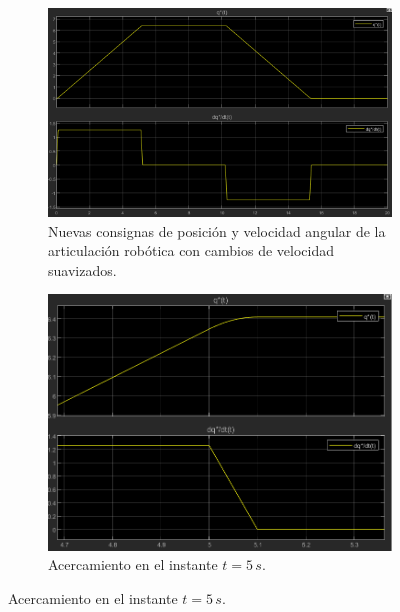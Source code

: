 \documentclass{article}
\begin{document}
\begin{figure}[H]
    \centering
    \begin{subfigure}[t]{0.55\textwidth}
        \centering
        \includegraphics[width=\textwidth]{Imagenes/perfil_trapezoidal_velocidad.png}
        \caption{Nuevas consignas de posición y velocidad angular de la articulación robótica con cambios de velocidad suavizados.}
        \label{fig:perfil_trapezoidal_velocidad}
    \end{subfigure}
    \hfill %
    \begin{subfigure}[t]{0.4\textwidth}
        \centering
        \includegraphics[width=\textwidth]{Imagenes/Acercamiento_perfil_trapezoidal_velocidad.png}
        \caption{Acercamiento en el instante \(t = 5\,s\).}
        \label{fig:Acercamiento_perfil_trapezoidal_velocidad}
    \end{subfigure}
\end{figure}
\end{document}
